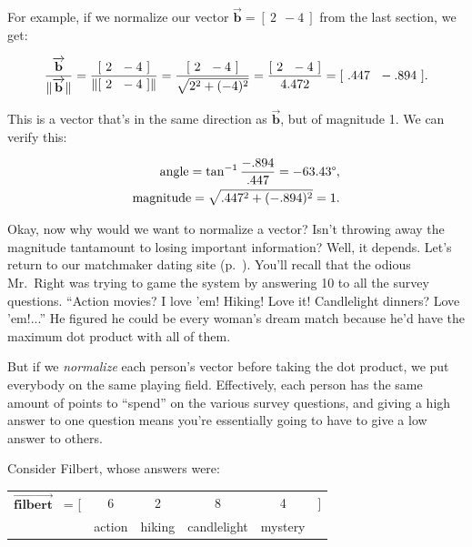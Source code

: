 For example, if we normalize our vector $\overrightarrow{\textbf{b}} = [\ 2\ \
-4\ ]$ from the last section, we get:

\vspace{-.15in}
\begin{align*}
\frac{\overrightarrow{\textbf{b}}}{\lVert\overrightarrow{\textbf{b}}\rVert} =
\frac{[\ 2\ \ -4\ ]}{\lVert[\ 2\ \ -4\ ]\rVert} =
\frac{[\ 2\ \ -4\ ]}{\sqrt{2^2 + (-4)^2}} =
\frac{[\ 2\ \ -4\ ]}{4.472} = [\ .447 \ \ -.894\ ].
\end{align*}

This is a vector that's in the same direction as $\overrightarrow{\textbf{b}}$,
but of magnitude 1. We can verify this:

\vspace{-.15in}
\begin{align*}
\textrm{angle} = \tan^{-1} \frac{-.894}{.447} = -63.43\degree, \\
\textrm{magnitude} = \sqrt{.447^2 + (-.894)^2} = 1.
\end{align*}

\label{matchmakerGameTheSystemStart}

Okay, now why would we want to normalize a vector? Isn't throwing away the
magnitude tantamount to losing important information? Well, it depends. Let's
return to our matchmaker dating site (p.~\pageref{matchmakerExample}). You'll
recall that the odious Mr.~Right was trying to game the system by answering 10
to all the survey questions. ``Action movies? I love 'em! Hiking! Love it!
Candlelight dinners? Love 'em!...'' He figured he could be every woman's dream
match because he'd have the maximum dot product with all of them.

But if we \textit{normalize} each person's vector before taking the dot
product, we put everybody on the same playing field. Effectively, each person
has the same amount of points to ``spend'' on the various survey questions, and
giving a high answer to one question means you're essentially going to have to
give a low answer to others.


Consider Filbert, whose answers were:

\begin{center}
\begin{tabular}{cccccc}
$\overrightarrow{\textbf{filbert}}$ \quad \ = [ & 6 & 2 & 8 & 4 & ] \\
& \scriptsize{action} & \scriptsize{hiking} & \scriptsize{candlelight} &
\scriptsize{mystery} & \medskip \\
\end{tabular}
\end{center}
\vspace{-.15in}

